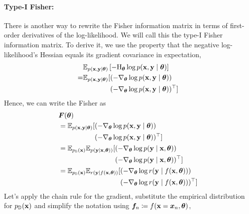 \paragraph{Type-I Fisher:} There is another way to rewrite the Fisher information matrix in terms of first-order derivatives of the log-likelihood.
We will call this the type-I Fisher information matrix.
To derive it, we use the property that the negative log-likelihood's Hessian equals its gradient covariance in expectation,
\begin{align*}
    & \mathbb{E}_{p({\mathbf{x}}, {\mathbf{y}} \mid {\bm{\theta}})}
  \left[
    -\mathrm{H}_{{\bm{\theta}}} \log p({\mathbf{x}}, {\mathbf{y}} \mid {\bm{\theta}})
    \right]
  \\
  = & \mathbb{E}_{p({\mathbf{x}}, {\mathbf{y}} \mid {\bm{\theta}})} [
    \begin{aligned}[t]
       & (-\nabla_{{\bm{\theta}}} \log p({\mathbf{x}}, {\mathbf{y}} \mid {\bm{\theta}})) \\
       & (-\nabla_{{\bm{\theta}}} \log p({\mathbf{x}}, {\mathbf{y}}\mid  {\bm{\theta}}))^{\top}]
    \end{aligned}
\end{align*}
Hence, we can write the Fisher as
\begin{align*}
  &{\bm{F}}({\bm{\theta}})
  \\
               & = \mathbb{E}_{p({\mathbf{x}}, {\mathbf{y}} \mid {\bm{\theta}})} [
    \begin{aligned}[t]
       & (-\nabla_{{\bm{\theta}}} \log p({\mathbf{x}}, {\mathbf{y}} \mid {\bm{\theta}}))        \\
       & (-\nabla_{{\bm{\theta}}} \log p({\mathbf{x}}, {\mathbf{y}} \mid {\bm{\theta}}))^{\top}]
    \end{aligned}
  \\
               & = \mathbb{E}_{p_{{\mathbb{D}}}({\mathbf{x}})}\mathbb{E}_{p({\mathbf{y}} \mid {\mathbf{x}}, {\bm{\theta}}))} [
    \begin{aligned}[t]
       & (-\nabla_{{\bm{\theta}}} \log p({\mathbf{y}} \mid {\mathbf{x}}, {\bm{\theta}}))        \\
       & (-\nabla_{{\bm{\theta}}} \log p({\mathbf{y}} \mid {\mathbf{x}}, {\bm{\theta}}))^{\top}]
    \end{aligned}
  \\
               & = \mathbb{E}_{p_{{\mathbb{D}}}({\mathbf{x}})}\mathbb{E}_{r({\mathbf{y}} \mid f({\mathbf{x}}, {\bm{\theta}}))} [
    \begin{aligned}[t]
       & (-\nabla_{{\bm{\theta}}} \log r({\mathbf{y}} \mid f({\mathbf{x}}, {\bm{\theta}})))        \\
       & (-\nabla_{{\bm{\theta}}} \log r({\mathbf{y}} \mid f({\mathbf{x}}, {\bm{\theta}})))^{\top}]
    \end{aligned}
\end{align*}
Let's apply the chain rule for the gradient, substitute the empirical distribution for $p_{{\mathbb{D}}}({\mathbf{x}})$ and simplify the notation using ${\bm{f}}_n \coloneqq f({\mathbf{x}} = {\bm{x}}_n, {\bm{\theta}})$,
